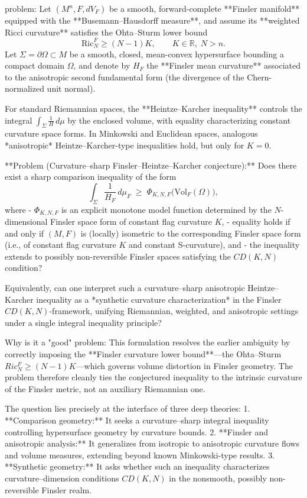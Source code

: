 problem:  
Let \((M^n,F,dV_F)\) be a smooth, forward-complete **Finsler manifold** equipped with the **Busemann–Hausdorff measure**, and assume its **weighted Ricci curvature** satisfies the Ohta–Sturm lower bound  
\[
\mathrm{Ric}_N^F \ge (N-1)K, \qquad K \in \mathbb{R}, \; N>n.
\]
Let \(\Sigma=\partial \Omega \subset M\) be a smooth, closed, mean-convex hypersurface bounding a compact domain \(\Omega\), and denote by \(H_F\) the **Finsler mean curvature** associated to the anisotropic second fundamental form (the divergence of the Chern-normalized unit normal).  

For standard Riemannian spaces, the **Heintze–Karcher inequality** controls the integral \(\int_{\Sigma}\frac{1}{H}\,d\mu\) by the enclosed volume, with equality characterizing constant curvature space forms.  
In Minkowski and Euclidean spaces, analogous *anisotropic* Heintze–Karcher-type inequalities hold, but only for \(K=0\).  

**Problem (Curvature–sharp Finsler–Heintze–Karcher conjecture):**  
Does there exist a sharp comparison inequality of the form
\[
\int_{\Sigma} \frac{1}{H_F} \, d\mu_F \;\geq\; \Phi_{K,N,F}\big(\mathrm{Vol}_F(\Omega)\big),
\]
where
- \(\Phi_{K,N,F}\) is an explicit monotone model function determined by the \(N\)-dimensional Finsler space form of constant flag curvature \(K\),  
- equality holds if and only if \((M,F)\) is (locally) isometric to the corresponding Finsler space form (i.e., of constant flag curvature \(K\) and constant S-curvature), and  
- the inequality extends to possibly non-reversible Finsler spaces satisfying the \(CD(K,N)\) condition?

Equivalently, can one interpret such a curvature–sharp anisotropic Heintze–Karcher inequality as a *synthetic curvature characterization* in the Finsler \(CD(K,N)\)-framework, unifying Riemannian, weighted, and anisotropic settings under a single integral inequality principle?

Why is it a "good" problem:  
This formulation resolves the earlier ambiguity by correctly imposing the **Finsler curvature lower bound**—the Ohta–Sturm \(Ric_N^F\ge (N-1)K\)—which governs volume distortion in Finsler geometry. The problem therefore cleanly ties the conjectured inequality to the intrinsic curvature of the Finsler metric, not an auxiliary Riemannian one.  

The question lies precisely at the interface of three deep theories:
1. **Comparison geometry:** It seeks a curvature–sharp integral inequality controlling hypersurface geometry by curvature bounds.  
2. **Finsler and anisotropic analysis:** It generalizes from isotropic to anisotropic curvature flows and volume measures, extending beyond known Minkowski-type results.  
3. **Synthetic geometry:** It asks whether such an inequality characterizes curvature–dimension conditions \(CD(K,N)\) in the nonsmooth, possibly non-reversible Finsler realm.

